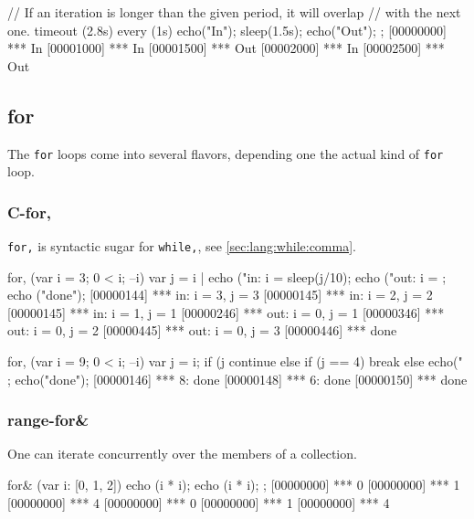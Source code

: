 \begin{urbiscript}[firstnumber=1]
// If an iteration is longer than the given period, it will overlap
// with the next one.
timeout (2.8s)
  every (1s)
  {
    echo("In");
    sleep(1.5s);
    echo("Out");
  };
[00000000] *** In
[00001000] *** In
[00001500] *** Out
[00002000] *** In
[00002500] *** Out
\end{urbiscript}

\subsection{for}

The \lstinline|for| loops come into several flavors, depending one the
actual kind of \lstinline|for| loop.

\subsubsection{C-for,}
\experimentalremoved{}

\lstinline|for,| is syntactic sugar for \lstinline|while,|, see
\autoref{sec:lang:while:comma}.

\begin{urbiscript}
for, (var i = 3; 0 < i; --i)
{
  var j = i |
  echo ("in: i = %
  sleep(j/10);
  echo ("out: i = %
};
echo ("done");
[00000144] *** in: i = 3, j = 3
[00000145] *** in: i = 2, j = 2
[00000145] *** in: i = 1, j = 1
[00000246] *** out: i = 0, j = 1
[00000346] *** out: i = 0, j = 2
[00000445] *** out: i = 0, j = 3
[00000446] *** done
\end{urbiscript}

\begin{urbiscript}
for, (var i = 9; 0 < i; --i)
{
  var j = i;
  if (j %
    continue
  else if (j == 4)
    break
  else
    echo("%
};
echo("done");
[00000146] *** 8: done
[00000148] *** 6: done
[00000150] *** done
\end{urbiscript}


\subsubsection{range-for\&}
\label{sec:lang:for:each:and}

One can iterate concurrently over the members of a collection.

\begin{urbiscript}
for& (var i: [0, 1, 2])
{
  echo (i * i);
  echo (i * i);
};
[00000000] *** 0
[00000000] *** 1
[00000000] *** 4
[00000000] *** 0
[00000000] *** 1
[00000000] *** 4
\end{urbiscript}

